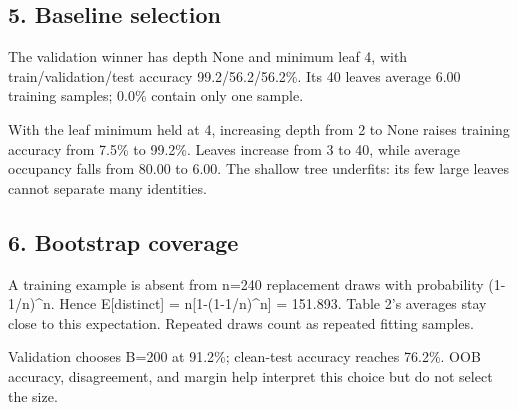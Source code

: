 \documentclass[10pt,twocolumn,letterpaper]{article}
\begin{document}
\subsection*{5. Baseline selection}
The validation winner has depth None and minimum leaf 4, with train/validation/test accuracy 99.2/56.2/56.2\%. Its 40 leaves average 6.00 training samples; 0.0\% contain only one sample.

With the leaf minimum held at 4, increasing depth from 2 to None raises training accuracy from 7.5\% to 99.2\%. Leaves increase from 3 to 40, while average occupancy falls from 80.00 to 6.00. The shallow tree underfits: its few large leaves cannot separate many identities.

\newpage
\subsection*{6. Bootstrap coverage}
A training example is absent from n=240 replacement draws with probability (1-1/n)\textasciicircum{}n. Hence E[distinct] = n[1-(1-1/n)\textasciicircum{}n] = 151.893. Table 2's averages stay close to this expectation. Repeated draws count as repeated fitting samples.

Validation chooses B=200 at 91.2\%; clean-test accuracy reaches 76.2\%. OOB accuracy, disagreement, and margin help interpret this choice but do not select the size.
\end{document}
